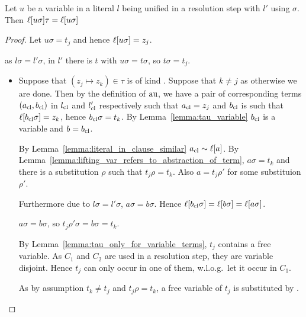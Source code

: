 \documentclass[,%
	paper=a4,%
	DIV14, 
	liststotoc,
	bibtotoc,
	draft=false,%
	numbers=noendperiod
]{scrartcl}
\begin{document}
\cbstart
\begin{lemma}
	\label{lemma:just_introduced_lifting_vars_not_affected_by_tau}
	Let $u$ be a variable in a literal $l$ being unified in a resolution step with $l'$ using $\sigma$.
	Then $\ell[u\sigma] \tau = \ell[u\sigma]$
\end{lemma}
\begin{proof}
	Let $u\sigma = t_j$ and hence $\ell[u\sigma] = z_j$.



	as $l\sigma = l'\sigma$, in $l'$ there is $t$ with $u\sigma = t\sigma$, so $t\sigma = t_j$.


	\begin{itemize}
			\item
				Suppose that $(z_j\mapsto z_k) \in \tau$ is of kind . Suppose that $k\neq j$ as otherwise we are done.
				Then by the definition of $\operatorname{au}$, we have a pair of corresponding terms $(a_\mathrm{cl}, b_\mathrm{cl})$ in $l_\mathrm{cl}$ and $l_\mathrm{cl}'$ respectively such that  
				$a_\mathrm{cl} = z_j$ and $b_\mathrm{cl}$ is such that $\ell[b_\mathrm{cl}\sigma] = z_k$, hence $b_\mathrm{cl}\sigma = t_k$.
				By Lemma~\ref{lemma:tau_variable} $b_\mathrm{cl}$ is a variable and $b = b_\mathrm{cl}$.

				By Lemma~\ref{lemma:literal_in_clause_similar} $a_\mathrm{cl} \sim \ell[a]$. 
				By Lemma~\ref{lemma:lifting_var_refers_to_abstraction_of_term}, $a\sigma = t_k$ and there is a substitution $\rho$ such that $t_j\rho = t_k$.
				Also $a = t_j\rho'$ for some substituion $\rho'$.

				Furthermore due to $l\sigma = l'\sigma$, $a\sigma = b\sigma$.
				Hence $\ell[b_\mathrm{cl}\sigma] = \ell[b\sigma] = \ell[a\sigma]$.

				$a\sigma = b\sigma$, so $t_j\rho'\sigma = b\sigma = t_k$. 

				By Lemma~\ref{lemma:tau_only_for_variable_terms}, $t_j$ contains a free variable.
				As $C_1$ and $C_2$ are used in a resolution step, they are variable disjoint. 
				Hence $t_j$ can only occur in one of them, w.l.o.g.\ let it occur in $C_1$.

				As by assumption $t_k \neq t_j$ and $t_j\rho = t_k$, a free variable of $t_j$ is substituted by .


\end{itemize}
\end{proof}
\end{document}
